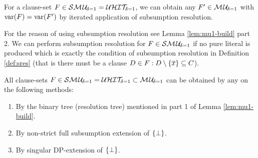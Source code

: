 \documentclass{report}
\begin{document}
\begin{lem}\label{lem:smu1tomu1}
For a clause-set $F \in \mathcal{S}\mathcal{M\hspace{0.8pt}U}_{\!\delta=1}=\mathcal{U}\mathcal{HIT}_{\!\!\delta=1} $, we can obtain any $F' \in  \mathcal{M\hspace{0.8pt}U}_{\!\delta=1}$ with $\operatorname{var}(F)=\operatorname{var}(F')$ by iterated application of subsumption resolution.
\end{lem}
\begin{prf}
For the reason of using subsumption resolution see Lemma \ref{lem:mu1-build} part 2. We can perform subsumption resolution for $F \in \mathcal{S}\mathcal{M\hspace{0.8pt}U}_{\!\delta=1}$ if no pure literal is produced which is exactly the condition of subsumption resolution in Definition \ref{def:sres} (that is there must be a clause $D \in F: D \setminus \{ \overline x \} \subseteq C$).
\end{prf}

\begin{lem}\label{lem:smu1-uhit1}
All clause-sets $F \in  \mathcal{S}\mathcal{M\hspace{0.8pt}U}_{\!\delta=1} = \mathcal{U}\mathcal{HIT}_{\!\!\delta=1} \subset \mathcal{M\hspace{0.8pt}U}_{\!\delta=1}$ can be obtained by any on the following methods:
  \begin{enumerate}
  \item By the binary tree (resolution tree) mentioned in part 1 of Lemma \ref{lem:mu1-build}.
  \item By non-strict full subsumption extension of $\{ \bot \}$.
  \item By singular DP-extension of $\{ \bot \}$.
  \end{enumerate} 
\end{lem}
\end{document}
